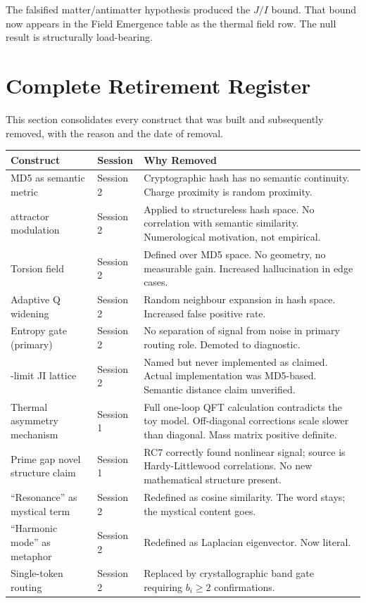 \documentclass[11pt]{article}
\begin{document}
The falsified matter/antimatter hypothesis produced the $J/I$ bound. That bound now appears in the Field Emergence table as the thermal field row. The null result is structurally load-bearing.

\section{Complete Retirement Register}
\label{sec:register}

This section consolidates every construct that was built and subsequently removed, with the reason and the date of removal.

\begin{longtable}{p{3.5cm}p{2cm}p{7cm}}
\toprule
\textbf{Construct} & \textbf{Session} & \textbf{Why Removed} \\
\midrule
MD5 as semantic metric & Session 2 & Cryptographic hash has no semantic continuity. Charge proximity is random proximity. \\
\addlinespace
369 attractor modulation & Session 2 & Applied to structureless hash space. No correlation with semantic similarity. Numerological motivation, not empirical. \\
\addlinespace
Torsion field & Session 2 & Defined over MD5 space. No geometry, no measurable gain. Increased hallucination in edge cases. \\
\addlinespace
Adaptive Q widening & Session 2 & Random neighbour expansion in hash space. Increased false positive rate. \\
\addlinespace
Entropy gate (primary) & Session 2 & No separation of signal from noise in primary routing role. Demoted to diagnostic. \\
\addlinespace
5-limit JI lattice & Session 2 & Named but never implemented as claimed. Actual implementation was MD5-based. Semantic distance claim unverified. \\
\addlinespace
Thermal asymmetry mechanism & Session 1 & Full one-loop QFT calculation contradicts the toy model. Off-diagonal corrections scale slower than diagonal. Mass matrix positive definite. \\
\addlinespace
Prime gap novel structure claim & Session 1 & RC7 correctly found nonlinear signal; source is Hardy-Littlewood correlations. No new mathematical structure present. \\
\addlinespace
``Resonance'' as mystical term & Session 2 & Redefined as cosine similarity. The word stays; the mystical content goes. \\
\addlinespace
``Harmonic mode'' as metaphor & Session 2 & Redefined as Laplacian eigenvector. Now literal. \\
\addlinespace
Single-token routing & Session 2 & Replaced by crystallographic band gate requiring $b_i \geq 2$ confirmations. \\
\bottomrule
\end{longtable}
\end{document}
